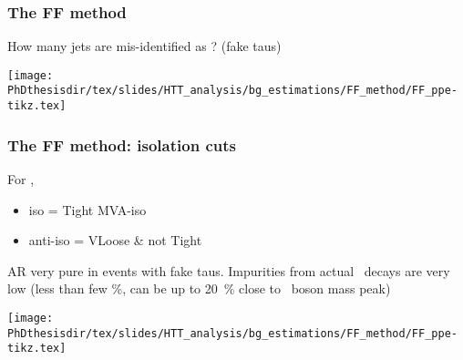 \begin{frame}
\frametitle{The FF method}

\manip How many jets are mis-identified as \tauh? (fake taus)

\pause

\begin{center}
\texttt{[image: \\PhDthesisdir/tex/slides/HTT\_analysis/bg\_estimations/FF\_method/FF\_ppe-tikz.tex]}
\end{center}
\end{frame}



\begin{frame}
\frametitle{The FF method: isolation cuts}

\begin{minipage}[c]{.45\textwidth}
For \tauh,
\begin{itemize}
\item iso = Tight MVA-iso
\item anti-iso = VLoose \& not Tight %
\end{itemize}

\manip AR very pure in events with fake taus.
\manip Impurities from actual \tauh\ decays are very low (less than few \%, can be up to \SI{20}{\%} close to \Zboson\ boson mass peak)
\end{minipage}
\hfill
\begin{minipage}[c]{.45\textwidth}
\vspace{\graphh}
\end{minipage}
\begin{minipage}[c]{.45\textwidth}
\begin{center}
\texttt{[image: \\PhDthesisdir/tex/slides/HTT\_analysis/bg\_estimations/FF\_method/FF\_ppe-tikz.tex]}
\end{center}
\end{minipage}

\end{frame}

